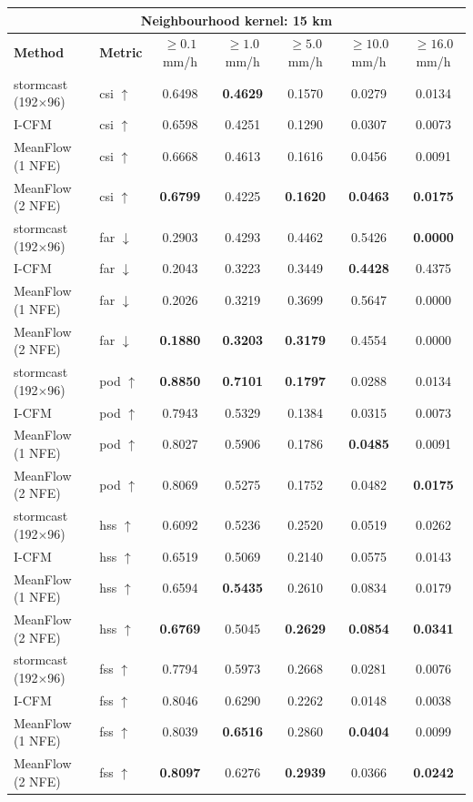 \documentclass[border=10pt]{standalone}
\begin{document}
\begin{tabular}{llccccc}
\toprule
\multicolumn{7}{c}{\textbf{Neighbourhood kernel: 15 km}} \\
\midrule
\textbf{Method} & \textbf{Metric} & $\geq 0.1$ mm/h & $\geq 1.0$ mm/h & $\geq 5.0$ mm/h & $\geq 10.0$ mm/h & $\geq 16.0$ mm/h \\
\midrule
stormcast (192$\times$96) & csi $\uparrow$ & 0.6498 & \textbf{0.4629} & 0.1570 & 0.0279 & 0.0134 \\
I-CFM & csi $\uparrow$ & 0.6598 & 0.4251 & 0.1290 & 0.0307 & 0.0073 \\
MeanFlow (1 NFE) & csi $\uparrow$ & 0.6668 & 0.4613 & 0.1616 & 0.0456 & 0.0091 \\
MeanFlow (2 NFE) & csi $\uparrow$ & \textbf{0.6799} & 0.4225 & \textbf{0.1620} & \textbf{0.0463} & \textbf{0.0175} \\
\midrule
stormcast (192$\times$96) & far $\downarrow$ & 0.2903 & 0.4293 & 0.4462 & 0.5426 & \textbf{0.0000} \\
I-CFM & far $\downarrow$ & 0.2043 & 0.3223 & 0.3449 & \textbf{0.4428} & 0.4375 \\
MeanFlow (1 NFE) & far $\downarrow$ & 0.2026 & 0.3219 & 0.3699 & 0.5647 & 0.0000 \\
MeanFlow (2 NFE) & far $\downarrow$ & \textbf{0.1880} & \textbf{0.3203} & \textbf{0.3179} & 0.4554 & 0.0000 \\
\midrule
stormcast (192$\times$96) & pod $\uparrow$ & \textbf{0.8850} & \textbf{0.7101} & \textbf{0.1797} & 0.0288 & 0.0134 \\
I-CFM & pod $\uparrow$ & 0.7943 & 0.5329 & 0.1384 & 0.0315 & 0.0073 \\
MeanFlow (1 NFE) & pod $\uparrow$ & 0.8027 & 0.5906 & 0.1786 & \textbf{0.0485} & 0.0091 \\
MeanFlow (2 NFE) & pod $\uparrow$ & 0.8069 & 0.5275 & 0.1752 & 0.0482 & \textbf{0.0175} \\
\midrule
stormcast (192$\times$96) & hss $\uparrow$ & 0.6092 & 0.5236 & 0.2520 & 0.0519 & 0.0262 \\
I-CFM & hss $\uparrow$ & 0.6519 & 0.5069 & 0.2140 & 0.0575 & 0.0143 \\
MeanFlow (1 NFE) & hss $\uparrow$ & 0.6594 & \textbf{0.5435} & 0.2610 & 0.0834 & 0.0179 \\
MeanFlow (2 NFE) & hss $\uparrow$ & \textbf{0.6769} & 0.5045 & \textbf{0.2629} & \textbf{0.0854} & \textbf{0.0341} \\
\midrule
stormcast (192$\times$96) & fss $\uparrow$ & 0.7794 & 0.5973 & 0.2668 & 0.0281 & 0.0076 \\
I-CFM & fss $\uparrow$ & 0.8046 & 0.6290 & 0.2262 & 0.0148 & 0.0038 \\
MeanFlow (1 NFE) & fss $\uparrow$ & 0.8039 & \textbf{0.6516} & 0.2860 & \textbf{0.0404} & 0.0099 \\
MeanFlow (2 NFE) & fss $\uparrow$ & \textbf{0.8097} & 0.6276 & \textbf{0.2939} & 0.0366 & \textbf{0.0242} \\
\bottomrule
\end{tabular}
\end{document}
